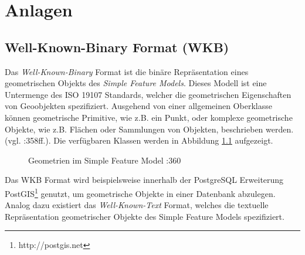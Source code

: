 \appendix
\chapter{Anlagen}
\section{Well-Known-Binary Format (WKB)}
\label{sec:appendix:wkb}
Das \textit{Well-Known-Binary} Format ist die binäre Repräsentation eines geometrischen Objekts des \textit{Simple Feature Models}.
Dieses Modell ist eine Untermenge des ISO 19107 Standards, welcher die geometrischen Eigenschaften von Geoobjekten spezifiziert. Ausgehend von einer allgemeinen Oberklasse können geometrische Primitive, wie z.B. ein Punkt, oder komplexe geometrische Objekte, wie z.B. Flächen oder Sammlungen von Objekten, beschrieben werden. (vgl. \cite{Bill2010}:358ff.). Die verfügbaren Klassen werden in Abbildung \ref{fig:bill_sfm} aufgezeigt.
\begin{figure}[!htb]
  \centering
   \caption{Geometrien im Simple Feature Model \protect\cite{Bill2010}:360}
   \label{fig:bill_sfm}
\end{figure}

Das WKB Format wird beispielsweise innerhalb der PostgreSQL Erweiterung PostGIS\footnote{http://postgis.net} genutzt, um geometrische Objekte in einer Datenbank abzulegen.
Analog dazu existiert das \textit{Well-Known-Text} Format, welches die textuelle Repräsentation geometrischer Objekte des Simple Feature Models spezifiziert.

